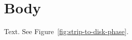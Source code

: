 \documentclass{article}
\begin{document}
\listoffigures
\section{Body}
Text. See Figure~\ref{fig:strip-to-disk-phase}.



\clearpage

\end{document}
